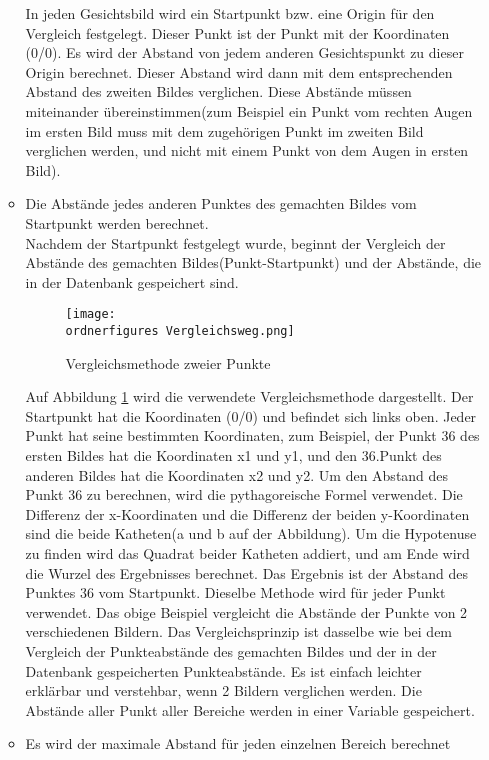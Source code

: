 \begin{enumerate}
\begin{itemize}
	In jeden Gesichtsbild wird ein Startpunkt bzw. eine Origin für den Vergleich festgelegt. Dieser Punkt ist der Punkt mit der Koordinaten (0/0). Es wird der Abstand von jedem anderen Gesichtspunkt zu dieser Origin berechnet. Dieser Abstand wird dann mit dem entsprechenden Abstand des zweiten Bildes verglichen. Diese Abstände müssen miteinander übereinstimmen(zum Beispiel ein Punkt vom rechten Augen im ersten Bild muss mit dem zugehörigen Punkt im zweiten Bild verglichen werden, und nicht mit einem Punkt von dem Augen in ersten Bild).
	\item Die Abstände jedes anderen Punktes des gemachten Bildes vom Startpunkt werden berechnet. \\
	Nachdem der Startpunkt festgelegt wurde, beginnt der Vergleich der Abstände des gemachten Bildes(Punkt-Startpunkt) und der Abstände, die in der Datenbank gespeichert sind.
	
	
	\begin{figure}[H]
		\centering
		\texttt{[image: \\ordnerfigures Vergleichsweg.png]}
		\caption{Vergleichsmethode zweier Punkte}
		\label{fig:Vergleichsweg}
	\end{figure}
	
	Auf Abbildung \ref{fig:Vergleichsweg} wird die verwendete Vergleichsmethode dargestellt. Der Startpunkt hat die Koordinaten (0/0) und befindet sich links oben. Jeder Punkt hat seine bestimmten Koordinaten, zum Beispiel, der Punkt 36 des ersten Bildes hat die Koordinaten x1 und y1, und den 36.Punkt des anderen Bildes hat die Koordinaten x2 und y2. Um den Abstand des Punkt 36 zu berechnen, wird die pythagoreische Formel verwendet. Die Differenz der x-Koordinaten und die Differenz der beiden y-Koordinaten sind die beide Katheten(a und b auf der Abbildung). Um die Hypotenuse zu finden wird das Quadrat beider Katheten addiert, und am Ende wird die Wurzel des Ergebnisses berechnet. Das Ergebnis ist der Abstand des Punktes 36 vom Startpunkt. Dieselbe Methode wird für jeder Punkt verwendet.
	Das obige Beispiel vergleicht die Abstände der Punkte von 2 verschiedenen Bildern. Das Vergleichsprinzip ist dasselbe wie bei dem Vergleich der Punkteabstände des gemachten Bildes und der in der Datenbank gespeicherten Punkteabstände. Es ist einfach leichter erklärbar und verstehbar, wenn 2 Bildern verglichen werden. 
	Die Abstände aller Punkt aller Bereiche werden in einer Variable gespeichert.\\
	
	\item Es wird der maximale Abstand für jeden einzelnen Bereich berechnet \\
	

\end{itemize}
\end{enumerate}
